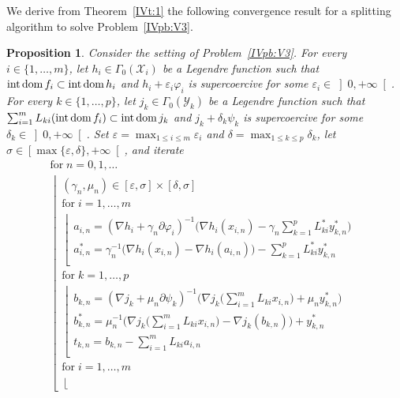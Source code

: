 \documentclass[a4paper,11pt,fleqn]{article}
\renewcommand{\leq}{\ensuremath{\leqslant}}
\newcommand{\XX}{\ensuremath{{\mathcal X}}}
\newcommand{\YY}{\ensuremath{{\mathcal Y}}}
\newcommand{\RPP}{\ensuremath{\left]0,+\infty\right[}}
\newcommand{\intdom}{\ensuremath{\text{\rm int\,dom}\,}}
\newtheorem{proposition}[theorem]{Proposition}
\theoremstyle{plain}{\theorembodyfont{\rmfamily}%
\newtheorem{conjecture}[theorem]{Conjecture}}
\theoremstyle{plain}{\theorembodyfont{\rmfamily}%
\newtheorem{example}[theorem]{Example}}
\theoremstyle{plain}{\theorembodyfont{\rmfamily}%
\newtheorem{remark}[theorem]{Remark}}
\theoremstyle{plain}{\theorembodyfont{\rmfamily}%
\newtheorem{algorithm}[theorem]{Algorithm}}
\theoremstyle{plain}{\theorembodyfont{\rmfamily}%
\newtheorem{condition}[theorem]{Condition}}
\theoremstyle{plain}{\theorembodyfont{\rmfamily}%
\newtheorem{definition}[theorem]{Definition}}
\theoremstyle{plain}{\theorembodyfont{\rmfamily}
\newtheorem{problem}[theorem]{Problem}}
\theoremstyle{plain}{\theorembodyfont{\rmfamily}
\newtheorem{notation}[theorem]{Notation}}
\numberwithin{equation}{section}
\begin{document}
We derive from Theorem~\ref{IVt:1} the following convergence
result for a splitting algorithm to solve Problem~\ref{IVpb:V3}.

\begin{proposition}
\label{4p:1}
Consider the setting of Problem~\ref{IVpb:V3}. For every 
$i\in\{1,\ldots,m\}$, let $h_i\in\Gamma_0(\XX_i)$ be a Legendre 
function such that $\intdom f_i\subset\intdom h_i$ and 
$h_i+\varepsilon_i\varphi_i$ is supercoercive for some
$\varepsilon_i\in\RPP$.
For every $k\in\{1,\ldots,p\}$, let $j_k\in\Gamma_0(\YY_k)$ 
be a Legendre function such that 
$\sum_{i=1}^mL_{ki}(\intdom f_i)\subset\intdom j_k$ and 
$j_k+\delta_k\psi_k$ is supercoercive for some $\delta_k\in\RPP$. 
Set $\varepsilon=\max_{1\leq i\leq m}\varepsilon_i$ and
$\delta=\max_{1\leq k\leq p}\delta_k$, let 
$\sigma\in\left[\max\{\varepsilon,\delta\},+\infty\right[$, and 
iterate
\begin{equation}
\label{4eKKnhf74g203}
\begin{array}{l}
\text{for}\;n=0,1,\ldots\\
\left\lfloor
\begin{array}{l}
(\gamma_n,\mu_n)\in\left[\varepsilon,\sigma\right]
\times\left[\delta,\sigma\right]\\[1mm]
\text{for}\;i=1,\ldots,m\\
\left\lfloor
\begin{array}{l}
a_{i,n}=(\nabla h_i+\gamma_n\partial\varphi_i)^{-1}
\Big(\nabla h_i(x_{i,n})
-\gamma_n\sum_{k=1}^pL_{ki}^*y_{k,n}^*\Big)\\[2mm]
a_{i,n}^*=\gamma_n^{-1}\big(\nabla h_i(x_{i,n})
-\nabla h_i(a_{i,n})\big)-\sum_{k=1}^pL_{ki}^*y_{k,n}^*\\[1mm]
\end{array}
\right.\\[3mm]
\text{for}\;k=1,\ldots,p\\
\left\lfloor
\begin{array}{l}
b_{k,n}=(\nabla j_k+\mu_n\partial\psi_k)^{-1}
\big(\nabla j_k\big(\sum_{i=1}^mL_{ki}x_{i,n}\big)
+\mu_ny_{k,n}^*\big)\\[1mm]
b_{k,n}^*=\mu_n^{-1}\big(\nabla j_k\big(\sum_{i=1}^m
L_{ki}x_{i,n}\big)-\nabla j_k(b_{k,n})\big)+y_{k,n}^*\\[1mm]
t_{k,n}=b_{k,n}-\sum_{i=1}^mL_{ki}a_{i,n}\\[1mm]
\end{array}
\right.\\
\text{for}\;i=1,\ldots,m\\
\left\lfloor
\begin{array}{l}

\end{array}
\end{array}
\end{array}
\end{equation}
\end{proposition}
\end{document}
